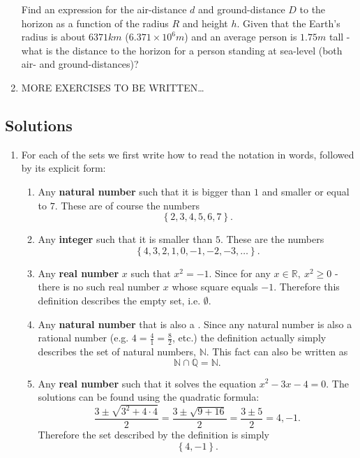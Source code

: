 \begin{enumerate}
		Find an expression for the air-distance $d$ and ground-distance $D$ to the horizon as a function of the radius $R$ and height $h$. Given that the Earth's radius is about $6371\si{km}$ ($6.371\times10^{6}\si{m}$) and an average person is $1.75\si{m}$ tall - what is the distance to the horizon for a person standing at sea-level (both air- and ground-distances)?

	\item MORE EXERCISES TO BE WRITTEN\ldots
\end{enumerate}

\subsection{Solutions}
\begin{enumerate}
	\item For each of the sets we first write how to read the notation in words, followed by its explicit form:
		\begin{enumerate}[label={(\roman*)}]
			\item Any \textbf{natural number} such that it is bigger than $1$ and smaller or equal to $7$. These are of course the numbers
				\[
					\left\{2,3,4,5,6,7\right\}.
				\]

			\item Any \textbf{integer} such that it is smaller than $5$. These are the numbers
				\[
					\left\{4,3,2,1,0,-1,-2,-3,\dots\right\}.
				\]

			\item Any \textbf{real number} $x$ such that $x^{2}=-1$. Since for any $x\in\mathbb{R},\ x^{2}\geq0$ - there is no such real number $x$ whose square equals $-1$. Therefore this definition describes the empty set, i.e. $\emptyset$.

			\item Any \textbf{natural number} that is also a . Since any natural number is also a rational number (e.g. $4=\frac{4}{1}=\frac{8}{2}$, etc.) the definition actually simply describes the set of natural numbers, $\mathbb{N}$. This fact can also be written as
				\[
					\mathbb{N} \cap \mathbb{Q} = \mathbb{N}.
				\]

			\item Any \textbf{real number} such that it solves the equation $x^{2}-3x-4=0$. The solutions can be found using the quadratic formula:
				\[
					\frac{3\pm\sqrt{3^{2}+4\cdot4}}{2} = \frac{3\pm\sqrt{9+16}}{2} = \frac{3\pm5}{2} = 4,-1.
				\]
				Therefore the set described by the definition is simply
				\[
					\left\{4,-1\right\}.
				\]


\end{enumerate}
\end{enumerate}
